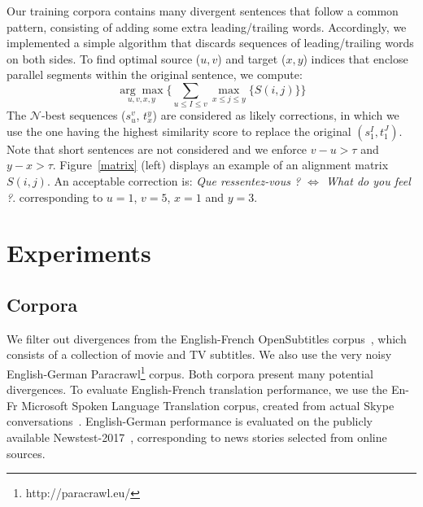 \documentclass[11pt,a4paper]{article}
\begin{document}
Our training corpora contains many divergent sentences that follow a common pattern, consisting of adding some extra leading/trailing words. %
Accordingly, we implemented a simple algorithm that discards sequences of leading/trailing words on both sides. 
To find optimal source ($u, v$) and target ($x, y$) indices that enclose parallel segments within the original sentence, we compute:
\begin{equation*}
\underset{u, v, x, y}{\arg\max} \Big \{      \underset{u \le I \le v}{\sum} \underset{x \le j \le y}{\max} \{ S(i,j) \}    \Big \}
\end{equation*}
The $\mathcal{N}$-best sequences ($s_u^v$, $t_x^y$) are considered as likely corrections, in which we use the one having the highest similarity score to replace the original $(s_1^I, t_1^J)$.
Note that short sentences are not considered and we enforce $v - u > \tau$ and $y - x > \tau $. 
Figure~\ref{matrix} (left) displays an example of an alignment matrix $S(i,j)$.
An acceptable correction is: \textit{Que ressentez-vous ? $\Leftrightarrow$ What do you feel ?}. 
corresponding to $u=1$, $v=5$, $x=1$ and $y=3$.

\section{Experiments}
\label{experiments}


\subsection{Corpora}
\label{corpora}

We filter out divergences from the English-French OpenSubtitles corpus~\cite{LisonTiedemann2016}, which consists of a collection of movie and TV subtitles. 
We also use the very noisy English-German Paracrawl\footnote{http://paracrawl.eu/} corpus. Both corpora present many potential divergences.
To evaluate English-French translation performance, we use the En-Fr Microsoft Spoken Language Translation corpus, created from actual Skype conversations~\cite{mslt-corpus-iwslt-2016-release}. 
English-German performance is evaluated on the publicly available Newstest-2017~\cite{W17-4717}, corresponding to news stories selected from online sources.
\end{document}
